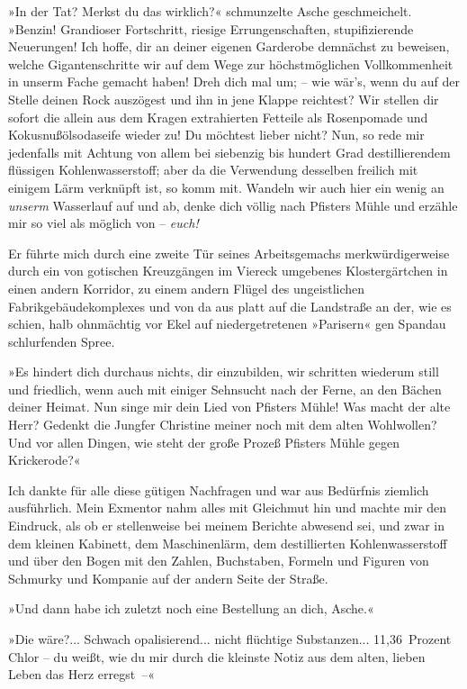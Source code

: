 »In der Tat? Merkst du das wirklich?« schmunzelte Asche
geschmeichelt. »Benzin! Grandioser Fortschritt, riesige
Errungenschaften, stupifizierende Neuerungen! Ich hoffe, dir an
deiner eigenen Garderobe demnächst zu beweisen, welche
Gigantenschritte wir auf dem Wege zur höchstmöglichen
Vollkommenheit in unserm Fache gemacht haben! Dreh dich mal um; –
wie wär's, wenn du auf der Stelle deinen Rock auszögest und ihn in
jene Klappe reichtest? Wir stellen dir sofort die allein aus dem
Kragen extrahierten Fetteile als Rosenpomade und
Kokusnußölsodaseife wieder zu! Du möchtest lieber nicht? Nun, so
rede mir jedenfalls mit Achtung von allem bei siebenzig bis hundert
Grad destillierendem flüssigen Kohlenwasserstoff; aber da die
Verwendung desselben freilich mit einigem Lärm verknüpft ist, so
komm mit. Wandeln wir auch hier ein wenig an \emph{unserm}
Wasserlauf auf und ab, denke dich völlig nach Pfisters Mühle und
erzähle mir so viel als möglich von – \emph{euch!}

Er führte mich durch eine zweite Tür seines Arbeitsgemachs
merkwürdigerweise durch ein von gotischen Kreuzgängen im Viereck
umgebenes Klostergärtchen in einen andern Korridor, zu einem andern
Flügel des ungeistlichen Fabrikgebäudekomplexes und von da aus
platt auf die Landstraße an der, wie es schien, halb ohnmächtig vor
Ekel auf niedergetretenen »Parisern« gen Spandau schlurfenden
Spree.

»Es hindert dich durchaus nichts, dir einzubilden, wir schritten
wiederum still und friedlich, wenn auch mit einiger Sehnsucht nach
der Ferne, an den Bächen deiner Heimat. Nun singe mir dein Lied von
Pfisters Mühle! Was macht der alte Herr? Gedenkt die Jungfer
Christine meiner noch mit dem alten Wohlwollen? Und vor allen
Dingen, wie steht der große Prozeß Pfisters Mühle gegen
Krickerode?«

Ich dankte für alle diese gütigen Nachfragen und war aus Bedürfnis
ziemlich ausführlich. Mein Exmentor nahm alles mit Gleichmut hin
und machte mir den Eindruck, als ob er stellenweise bei meinem
Berichte abwesend sei, und zwar in dem kleinen Kabinett, dem
Maschinenlärm, dem destillierten Kohlenwasserstoff und über den
Bogen mit den Zahlen, Buchstaben, Formeln und Figuren von Schmurky
und Kompanie auf der andern Seite der Straße.

»Und dann habe ich zuletzt noch eine Bestellung an dich, Asche.«

»Die wäre?... Schwach opalisierend... nicht flüchtige Substanzen...
11,36~Prozent Chlor – du weißt, wie du mir durch die kleinste Notiz
aus dem alten, lieben Leben das Herz erregst~–«

